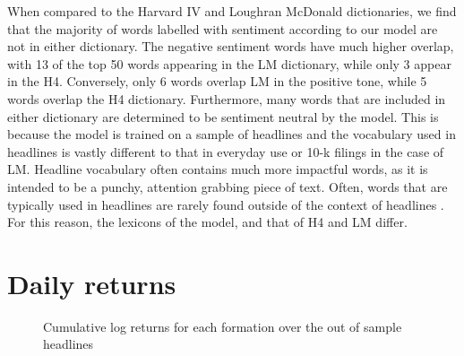 When compared to the Harvard IV and Loughran McDonald dictionaries, we find that the majority of words labelled with sentiment according to our model are not in either dictionary. The negative sentiment words have much higher overlap, with 13 of the top 50 words appearing in the LM dictionary, while only 3 appear in the H4. Conversely, only 6 words overlap LM in the positive tone, while 5 words overlap the H4 dictionary. Furthermore, many words that are included in either dictionary are determined to be sentiment neutral by the model. This is because the model is trained on a sample of headlines and the vocabulary used in headlines is vastly different to that in everyday use or 10-k filings in the case of LM. Headline vocabulary often contains much more impactful words, as it is intended to be a punchy, attention grabbing piece of text. Often, words that are typically used in headlines are rarely found outside of the context of headlines \cite{language-newspapers}. For this reason, the lexicons of the model, and that of H4 and LM differ.

\section{Daily returns}

\begin{figure}[!ht]
      \centering
{}
\label{graph-returns}
\caption[Daily cumulative log returns]{Cumulative log returns for each formation over the out of sample headlines}
\end{figure}

